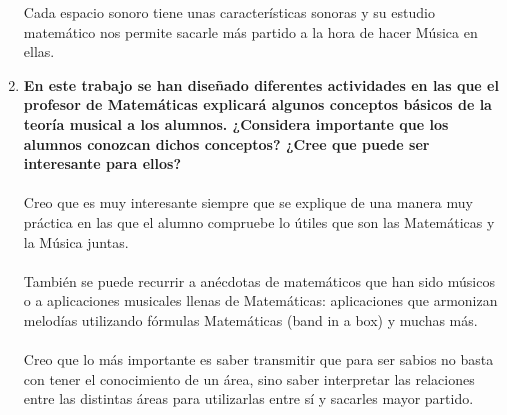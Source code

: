 \documentclass[a4paper, openright, 11pt, titlepage]{report}
\theoremstyle{definition}\newtheorem{defin}[propo]{Definition}
\theoremstyle{definition}\newtheorem{obser}[propo]{Remark}
\theoremstyle{definition}\newtheorem{ejem}[propo]{Ejemplo}
\theoremstyle{definition}\newtheorem{algoritmo}[propo]{Algoritmo}
\begin{document}
\begin{enumerate}
    Cada espacio sonoro tiene unas características sonoras y su estudio matemático nos permite sacarle más partido a la hora de hacer Música en ellas.
    \item \textbf{En este trabajo se han diseñado diferentes actividades en las que el profesor de Matemáticas explicará algunos conceptos básicos de la teoría musical a los alumnos. ¿Considera importante que los alumnos conozcan dichos conceptos? ¿Cree que puede ser interesante para ellos?}\\\\
    Creo que es muy  interesante siempre que se explique de una manera muy práctica en las que el alumno compruebe lo útiles que son las Matemáticas y la Música juntas.\\\\
    También se puede recurrir a anécdotas de matemáticos que han sido músicos o a aplicaciones musicales llenas de Matemáticas: aplicaciones que armonizan melodías utilizando fórmulas Matemáticas (band in a box) y muchas más.\\\\
    Creo que lo más importante es saber transmitir que para ser sabios no basta con tener el conocimiento de un área, sino saber interpretar las relaciones entre las distintas áreas para utilizarlas entre sí y sacarles mayor partido.
\end{enumerate}
\end{document}
